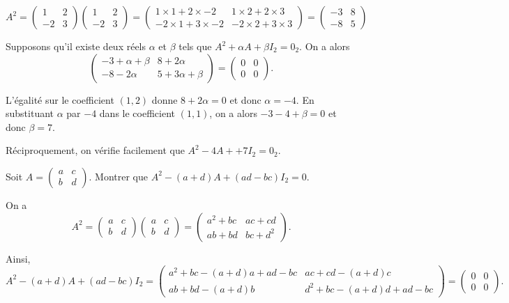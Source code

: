 \documentclass[11pt,fleqn]{book} %
\begin{document}
\begin{solution}
\[ A^2 = \begin{pmatrix}1 & 2 \\-2 & 3 \end{pmatrix}\begin{pmatrix}1 & 2 \\-2 & 3 \end{pmatrix} = \begin{pmatrix} 1 \times 1 + 2 \times -2 & 1 \times 2 + 2 \times 3 \\ -2 \times 1 + 3 \times -2 & -2 \times 2 + 3 \times 3\end{pmatrix}= \begin{pmatrix} -3 & 8 \\ -8 & 5\end{pmatrix}\]

Supposons qu'il existe deux réels \(\alpha\) et \(\beta\) tels que  \(A^2+\alpha A + \beta I_2 = 0_2\). On a alors
\[ \begin{pmatrix} -3 + \alpha + \beta & 8 + 2\alpha \\ -8 -2\alpha & 5 + 3\alpha + \beta\end{pmatrix} = \begin{pmatrix}0&0\\0&0\end{pmatrix}.\]

L'égalité sur le coefficient \((1,2)\) donne \(8+2\alpha = 0\) et donc \(\alpha = -4\).
En substituant \(\alpha\) par \(-4\) dans le coefficient \((1,1)\), on a alors \(-3-4+\beta = 0\) et donc \(\beta = 7\).

Réciproquement, on vérifie facilement que \(A^2-4 A + +7I_2 = 0_2\).
\end{solution}

\begin{exercise}[topic=mat02]Soit $A=\begin{pmatrix}a & c \\b & d \end{pmatrix}$. Montrer que $A^2 - (a+d)A + (ad-bc)I_2=0$.\end{exercise}

\begin{solution}On a 
\[A^2=\begin{pmatrix}a & c \\b & d \end{pmatrix}\begin{pmatrix}a & c \\b & d \end{pmatrix}=\begin{pmatrix}a^2+bc & ac+cd \\ ab+bd & bc + d^2\end{pmatrix}.\]

Ainsi,
\[ A^2 - (a+d)A + (ad-bc)I_2 = \begin{pmatrix} a^2+bc - (a+d)a + ad - bc & ac + cd  -(a+d)c \\ ab+bd-(a+d)b & d^2+bc - (a+d)d +ad-bc\end{pmatrix} = \begin{pmatrix} 0 &0\\0&0\end{pmatrix}.\]\end{solution}
\end{document}
